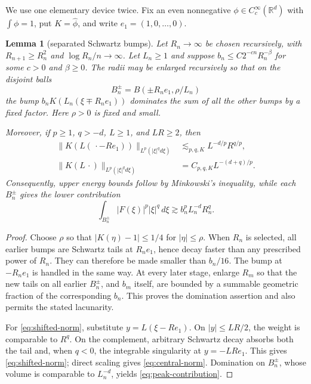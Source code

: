 \documentclass[11pt]{article}
\newtheorem{lemma}[theorem]{Lemma}
\newcommand{\R}{\mathbb R}
\begin{document}
We use one elementary device twice. Fix an even nonnegative
\(\phi\in C_c^\infty(\R^d)\) with \(\int\phi=1\), put
\(K=\widehat\phi\), and write $e_1=(1,0,\dots,0)$.

\begin{lemma}[separated Schwartz bumps]\label{lem:bumps}
Let $R_n\to\infty$ be chosen recursively, with
\(R_{n+1}\ge R_n^2\) and $\log R_n/n\to\infty$. Let $L_n\ge1$ and suppose
\(b_n\le C2^{-cn}R_n^{-\beta}\) for some $c>0$ and $\beta\ge0$.
The radii may be enlarged recursively so that on the disjoint balls
\[
 B_n^\pm=B(\pm R_ne_1,\rho/L_n)
\]
the bump \(b_nK(L_n(\xi\mp R_ne_1))\) dominates the sum of all the other
bumps by a fixed factor. Here $\rho>0$ is fixed and small.

Moreover, if $p\ge1$, $q>-d$, $L\ge1$, and $LR\ge2$, then
\begin{align}
 \|K(L(\,\cdot-Re_1))\|_{L^p(|\xi|^q d\xi)}
 &\lesssim_{p,q,K} L^{-d/p}R^{q/p},\label{eq:shifted-norm}\\
 \|K(L\,\cdot)\|_{L^p(|\xi|^q d\xi)}
 &=C_{p,q,K}L^{-(d+q)/p}.\label{eq:central-norm}
\end{align}
Consequently, upper energy bounds follow by Minkowski's inequality, while
each $B_n^\pm$ gives the lower contribution
\begin{equation}\label{eq:peak-contribution}
 \int_{B_n^\pm}|F(\xi)|^p|\xi|^q\,d\xi
 \gtrsim b_n^pL_n^{-d}R_n^q.
\end{equation}
\end{lemma}

\begin{proof}
Choose $\rho$ so that
\(|K(\eta)-1|\le1/4\) for $\lvert\eta\rvert\le\rho$.
When $R_n$ is selected, all earlier bumps are Schwartz tails at
\(R_ne_1\), hence decay faster than any prescribed power of $R_n$. They
can therefore be made smaller than $b_n/16$. The bump at
\(-R_ne_1\) is handled in the same way. At every later stage, enlarge
\(R_m\) so that the new tails on all earlier $B_n^\pm$, and $b_m$
itself, are bounded by a summable geometric fraction of the corresponding
$b_n$. This proves the domination assertion and also permits the stated
lacunarity.

For \eqref{eq:shifted-norm}, substitute
\(y=L(\xi-Re_1)\). On \(|y|\le LR/2\), the weight is comparable to
\(R^q\). On the complement, arbitrary Schwartz decay absorbs both the
tail and, when $q<0$, the integrable singularity at $y=-LRe_1$.
This gives \eqref{eq:shifted-norm}; direct scaling gives
\eqref{eq:central-norm}. Domination on $B_n^\pm$, whose volume is
comparable to $L_n^{-d}$, yields \eqref{eq:peak-contribution}.
\end{proof}
\end{document}
